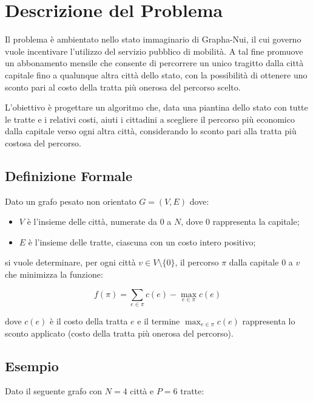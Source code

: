 \chapter{Descrizione del Problema}

Il problema è ambientato nello stato immaginario di Grapha-Nui, il cui governo 
vuole incentivare l'utilizzo del servizio pubblico di mobilità. A tal fine 
promuove un abbonamento mensile che consente di percorrere un unico tragitto 
dalla città capitale fino a qualunque altra città dello stato, con la possibilità 
di ottenere uno sconto pari al costo della tratta più onerosa del percorso scelto.

L'obiettivo è progettare un algoritmo che, data una piantina dello stato con 
tutte le tratte e i relativi costi, aiuti i cittadini a scegliere il percorso 
più economico dalla capitale verso ogni altra città, considerando lo sconto 
pari alla tratta più costosa del percorso.

\section{Definizione Formale}

Dato un grafo pesato non orientato $G = (V, E)$ dove:

\begin{itemize}
    \item $V$ è l'insieme delle città, numerate da $0$ a $N$, dove $0$ 
    rappresenta la capitale;
    \item $E$ è l'insieme delle tratte, ciascuna con un costo intero positivo;
\end{itemize}

si vuole determinare, per ogni città $v \in V \setminus \{0\}$, il percorso 
$\pi$ dalla capitale $0$ a $v$ che minimizza la funzione:

\begin{equation}
    f(\pi) = \sum_{e \in \pi} c(e) - \max_{e \in \pi} c(e)
\end{equation}

dove $c(e)$ è il costo della tratta $e$ e il termine $\max_{e \in \pi} c(e)$ 
rappresenta lo sconto applicato (costo della tratta più onerosa del percorso).

\section{Esempio}

Dato il seguente grafo con $N = 4$ città e $P = 6$ tratte:

